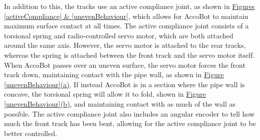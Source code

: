 \documentclass[11pt]{article}		%
\begin{document}
				In addition to this, the tracks use an active compliance joint, as shown in \hyperref[activeCompliance]{Figures \ref*{activeCompliance} \& \ref*{unevenBehaviour}}, which allows for AccoBot to maintain maximum surface contact at all times.
				The active compliance joint consists of a torsional spring and radio-controlled servo motor, which are both attached around the same axis.
				However, the servo motor is attached to the rear tracks, whereas the spring is attached between the front track and the servo motor itself.
				When AccoBot passes over an uneven surface, the servo motor forces the front track down, maintaining contact with the pipe wall, as shown in \hyperref[unevenBehaviour]{Figure \ref*{unevenBehaviour}(a)}.
				If instead AccoBot is in a section where the pipe wall is concave, the torsional spring will allow it to fold, shown in \hyperref[unevenBehaviour]{Figure \ref*{unevenBehaviour}(b)}, and maintaining contact with as much of the wall as possible.
				The active compliance joint also includes an angular encoder to tell how much the front track has been bent, allowing for the active compliance joint to be better controlled.			
\end{document}
